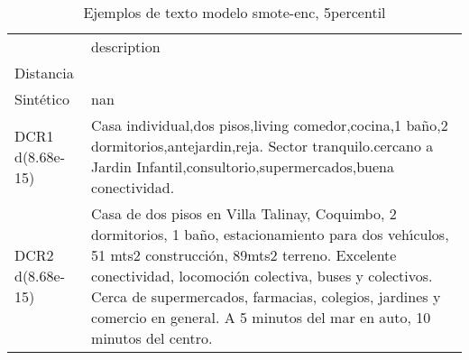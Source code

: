 \begin{table}[H]
\centering
\fontsize{10}{14}\selectfont
\caption{Ejemplos de texto modelo smote-enc, 5percentil}
\label{table-example-economicos-b-2-smote-enc-5p-text}
\begin{tabular}{|l|m{35em}|}
\hline
\rowcolor[gray]{0.8}
 & description \\
Distancia &  \\
\hline Sintético & nan \\
\hline DCR1 d(8.68e-15) & Casa individual,dos pisos,living comedor,cocina,1 ba\~no,2 dormitorios,antejardin,reja.    Sector tranquilo.cercano a Jardin Infantil,consultorio,supermercados,buena conectividad. \\
\hline DCR2 d(8.68e-15) & Casa de dos pisos en Villa Talinay, Coquimbo, 2 dormitorios, 1 ba\~no, estacionamiento para dos veh{\'\i}culos, 51 mts2 construcci\'on, 89mts2 terreno. Excelente conectividad, locomoci\'on colectiva, buses y colectivos. Cerca de supermercados, farmacias, colegios, jardines y comercio en general. A 5 minutos del mar en auto, 10 minutos del centro. \\
\hline
\end{tabular}
\end{table}
